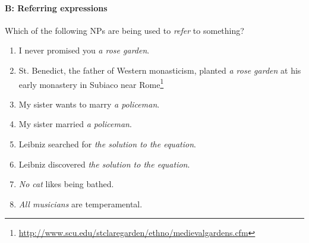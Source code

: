 {\paragraph*{B: Referring expressions}

Which of the following NPs are being used to \textit{refer} to something?

\begin{enumerate}[label=\alph*.]
\item I never promised you \textit{a rose garden}.
\item St. Benedict, the father of Western monasticism, planted \textit{a rose garden} at his early monastery in Subiaco near Rome\footnote{\url{http://www.scu.edu/stclaregarden/ethno/medievalgardens.cfm}}
\item My sister wants to marry \textit{a policeman}.
\item My sister married \textit{a policeman}.
\item Leibniz searched for \textit{the solution to the equation}.
\item Leibniz discovered \textit{the solution to the equation}.
\item \textit{No cat} likes being bathed.
\item \textit{All musicians} are temperamental.
\end{enumerate}
}
